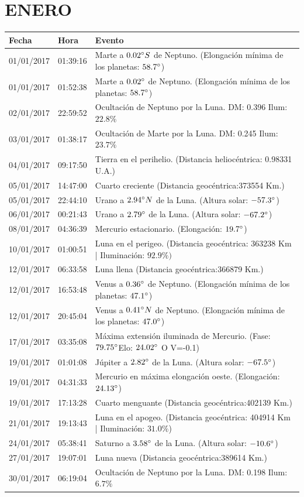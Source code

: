 \documentclass[12pt,a4paper,oneside]{article}
\begin{document}
\section{ENERO}
\begin{center}
\begin{tabular}{ |l| l| l| }
\hline
 \textbf{Fecha} & \textbf{Hora} & \textbf{Evento}\\
 \hline
 01/01/2017& 01:39:16 &	Marte a $0.02 \degree S$ de Neptuno. (Elongación mínima de los planetas: $58.7 \degree $)	\\
01/01/2017&01:52:38 &	Marte a $0.02 \degree $ de Neptuno. (Elongación mínima de los planetas: $58.7 \degree $)	\\
02/01/2017&22:59:52 &	Ocultación de Neptuno por la Luna. DM: 0.396 Ilum: $22.8\%$ \\
03/01/2017&01:38:17 &	Ocultación de Marte por la Luna. DM: 0.245 Ilum: $23.7\%$\\
04/01/2017& 09:17:50 &	Tierra en el perihelio. (Distancia heliocéntrica: 0.98331 U.A.)	\\
05/01/2017&14:47:00 &	Cuarto creciente (Distancia geocéntrica:373554 Km.)	\\
05/01/2017&22:44:10 &	Urano a $2.94 \degree N$ de la Luna. (Altura solar: $-57.3 \degree $)\\
06/01/2017&00:21:43 &	Urano a $2.79 \degree $ de la Luna. (Altura solar: $-67.2 \degree $)\\
08/01/2017&04:36:39 &	Mercurio estacionario. (Elongación: $19.7 \degree $)\\
10/01/2017&01:00:51 &	Luna en el perigeo. (Distancia geocéntrica: 363238 Km | Iluminación: $92.9\%)$\\
12/01/2017&06:33:58 &	Luna llena (Distancia geocéntrica:366879 Km.)	\\
12/01/2017&16:53:48 &	Venus a $0.36 \degree $ de Neptuno. (Elongación mínima de los planetas: $47.1 \degree $)	\\
12/01/2017&20:45:04 &	Venus a $0.41 \degree N$ de Neptuno. (Elongación mínima de los planetas: $47.0 \degree $)	\\
17/01/2017&03:35:08 &	Máxima extensión iluminada de Mercurio. (Fase: $79.75 \degree $Elo: $24.02 \degree $ O V=-0.1)	\\
19/01/2017& 01:01:08 &	Júpiter a $2.82 \degree $ de la Luna. (Altura solar: $-67.5 \degree $)\\
19/01/2017& 04:31:33 &	Mercurio en máxima elongación oeste. (Elongación: $24.13 \degree $)	\\
19/01/2017& 17:13:28 &	Cuarto menguante (Distancia geocéntrica:402139 Km.)	\\
21/01/2017&19:13:43 &	Luna en el apogeo. (Distancia geocéntrica: 404914 Km | Iluminación: $31.0\%$)	\\
24/01/2017&05:38:41 &	Saturno a $3.58 \degree $ de la Luna. (Altura solar: $-10.6 \degree $)	\\
27/01/2017&19:07:01 &	Luna nueva (Distancia geocéntrica:389614 Km.)	\\
30/01/2017&06:19:04 &	Ocultación de Neptuno por la Luna. DM: 0.198 Ilum: $6.7\%$ \\
\hline
\end{tabular}
\end{center}
\end{document}
